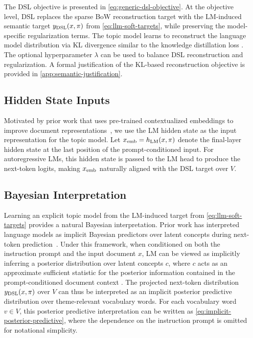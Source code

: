 \documentclass{article}
\theoremstyle{plain}
\theoremstyle{definition}
\theoremstyle{remark}
\begin{document}
The DSL objective is presented in \autoref{eq:generic-dsl-objective}.
At the objective level, DSL replaces the sparse BoW reconstruction target with the LM-induced semantic target $y_{\rm DSL}(x, \pi)$ from \autoref{eq:llm-soft-targets}, while preserving the model-specific regularization terms.
The topic model learns to reconstruct the language model distribution via KL divergence similar to the knowledge distillation loss \citep{hinton2015distilling}. 
The optional hyperparameter $\lambda$ can be used to balance DSL reconstruction and regularization. A formal justification of the KL-based reconstruction objective is provided in \autoref{app:semantic-justification}.


\subsection{Hidden State Inputs}
\label{subsec:hidden-input}
Motivated by prior work that uses pre-trained contextualized embeddings to improve document representations~\citep{bianchi-etal-2021-pre, fang-etal-2024-cwtm}, we use the LM hidden state as the input representation for the topic model. Let $x_{\rm emb}=h_{\rm LM}(x,\pi)$ denote the final-layer hidden state at the last position of the prompt-conditioned input. For autoregressive LMs, this hidden state is passed to the LM head to produce the next-token logits, making $x_{\rm emb}$ naturally aligned with the DSL target over $V$.

\subsection{Bayesian Interpretation}
\label{subsec:bayesian-interpretation}

Learning an explicit topic model from the LM-induced target from \autoref{eq:llm-soft-targets} provides a natural Bayesian interpretation. 
Prior work has interpreted language models as implicit Bayesian predictors over latent concepts during next-token prediction~\citep{xie2022an, wang2023large}.
Under this framework, when conditioned on both the instruction prompt and the input document $x$, LM can be viewed as implicitly inferring a posterior distribution over latent concepts $c$, where $c$ acts as
an approximate sufficient statistic for the posterior information contained in the prompt-conditioned document context \citep{wang2023large}. The projected next-token distribution $y_{\rm DSL}(x, \pi)$ over $V$ can thus be interpreted as an implicit posterior predictive distribution over theme-relevant vocabulary words.
For each vocabulary word $v\in V$, this posterior predictive interpretation can be written as \autoref{eq:implicit-posterior-predictive}, where the dependence on the instruction prompt is omitted for notational simplicity.
\end{document}
